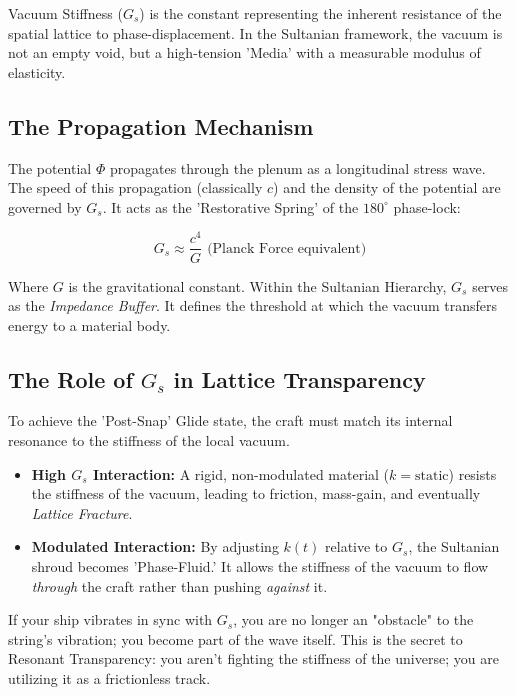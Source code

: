 \documentclass[11pt]{article}
\begin{document}
Vacuum Stiffness ($G_s$) is the constant representing the inherent resistance of the spatial lattice to phase-displacement. In the Sultanian framework, the vacuum is not an empty void, but a high-tension 'Media' with a measurable modulus of elasticity.

\subsection{The Propagation Mechanism}
The potential $\Phi$ propagates through the plenum as a longitudinal stress wave. The speed of this propagation (classically $c$) and the density of the potential are governed by $G_s$. It acts as the 'Restorative Spring' of the $180^\circ$ phase-lock:

\begin{equation}
    G_s \approx \frac{c^4}{G} \text{ (Planck Force equivalent)}
\end{equation}

Where $G$ is the gravitational constant. Within the Sultanian Hierarchy, $G_s$ serves as the \textit{Impedance Buffer}. It defines the threshold at which the vacuum transfers energy to a material body.

\subsection{The Role of $G_s$ in Lattice Transparency}
To achieve the 'Post-Snap' Glide state, the craft must match its internal resonance to the stiffness of the local vacuum. 
\begin{itemize}
    \item \textbf{High $G_s$ Interaction:} A rigid, non-modulated material ($k = \text{static}$) resists the stiffness of the vacuum, leading to friction, mass-gain, and eventually \textit{Lattice Fracture}.
    \item \textbf{Modulated Interaction:} By adjusting $k(t)$ relative to $G_s$, the Sultanian shroud becomes 'Phase-Fluid.' It allows the stiffness of the vacuum to flow \textit{through} the craft rather than pushing \textit{against} it.
\end{itemize}

If your ship vibrates in sync with $G_s$, you are no longer an "obstacle" to the string's vibration; you become part of the wave itself. This is the secret to Resonant Transparency: you aren't fighting the stiffness of the universe; you are utilizing it as a frictionless track.\\
\end{document}
